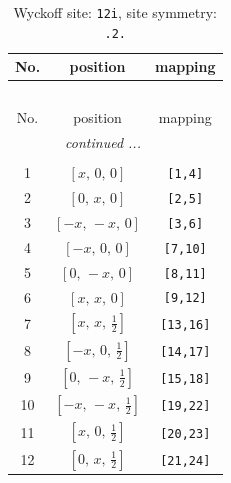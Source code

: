 \documentclass[fleqn,8pt]{jsarticle}
\begin{document}
\renewcommand{\arraystretch}{1.2}
\begin{longtable}{ccc}
\caption{Wyckoff site: {\tt 12i}, site symmetry: {\tt .2.}}
 \\
 \hline \hline
No. & position & mapping \\ \hline \endfirsthead

\multicolumn{2}{l}{\tablename\ \thetable{}} \\
 \hline \hline
No. & position & mapping \\ \hline \endhead

 \hline \hline
\multicolumn{2}{r}{\footnotesize\it continued ...} \\ \endfoot

 \hline \hline
\multicolumn{2}{r}{} \\ \endlastfoot

1 & $\left[ x,\, 0,\, 0 \right]$ & {\tt [1,4]} \\ \hline
2 & $\left[ 0,\, x,\, 0 \right]$ & {\tt [2,5]} \\ \hline
3 & $\left[ - x,\, - x,\, 0 \right]$ & {\tt [3,6]} \\ \hline
4 & $\left[ - x,\, 0,\, 0 \right]$ & {\tt [7,10]} \\ \hline
5 & $\left[ 0,\, - x,\, 0 \right]$ & {\tt [8,11]} \\ \hline
6 & $\left[ x,\, x,\, 0 \right]$ & {\tt [9,12]} \\ \hline
7 & $\left[ x,\, x,\, \frac{1}{2} \right]$ & {\tt [13,16]} \\ \hline
8 & $\left[ - x,\, 0,\, \frac{1}{2} \right]$ & {\tt [14,17]} \\ \hline
9 & $\left[ 0,\, - x,\, \frac{1}{2} \right]$ & {\tt [15,18]} \\ \hline
10 & $\left[ - x,\, - x,\, \frac{1}{2} \right]$ & {\tt [19,22]} \\ \hline
11 & $\left[ x,\, 0,\, \frac{1}{2} \right]$ & {\tt [20,23]} \\ \hline
12 & $\left[ 0,\, x,\, \frac{1}{2} \right]$ & {\tt [21,24]} \\
\end{longtable}
\renewcommand{\arraystretch}{1.2}
\end{document}
